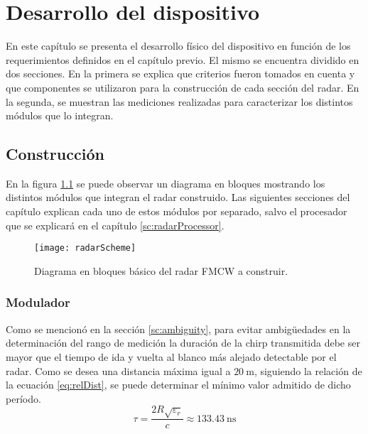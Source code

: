 \chapter{Desarrollo del dispositivo} \label{ch:development}

\ifpdf
    \graphicspath{{Chapter3/Figs/Raster/}{Chapter3/Figs/PDF/}{Chapter3/Figs/}}
\else
    \graphicspath{{Chapter3/Figs/Vector/}{Chapter3/Figs/}}
\fi

En este capítulo se presenta el desarrollo físico del dispositivo en función de los requerimientos definidos en el capítulo previo. El mismo se encuentra dividido en dos secciones. En la primera se explica que criterios fueron tomados en cuenta y que componentes se utilizaron para la construcción de cada sección del radar. En la segunda, se muestran las mediciones realizadas para caracterizar los distintos módulos que lo integran.


\section{Construcción}

En la figura \ref{fig:radarDiagram} se puede observar un diagrama en bloques mostrando los distintos módulos que integran el radar construido. Las siguientes secciones del capítulo explican cada uno de estos módulos por separado, salvo el procesador que se explicará en el capítulo \ref{sc:radarProcessor}.
\begin{figure}
 \centering
 \texttt{[image: radarScheme]}
 \caption{Diagrama en bloques básico del radar FMCW a construir.}
 \label{fig:radarDiagram}
\end{figure}


\subsection{Modulador}

Como se mencionó en la sección \ref{sc:ambiguity}, para evitar ambigüedades en la determinación del rango de medición la duración de la chirp transmitida debe ser mayor que el tiempo de ida y vuelta al blanco más alejado detectable por el radar. Como se desea una distancia máxima igual a $\SI{20}{\meter}$, siguiendo la relación de la ecuación \ref{eq:relDist}, se puede determinar el mínimo valor admitido de dicho período.
\begin{equation}
  \tau = \dfrac{2R\sqrt{\varepsilon_r}}{c} \approx \SI{133.43}{\nano\second}
\end{equation}

